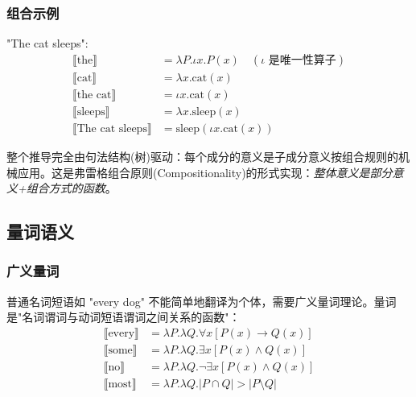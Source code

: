 \subsubsection{组合示例}

"The cat sleeps":
\begin{equation}
    \begin{aligned}
    \llbracket \text{the} \rrbracket &= \lambda P.\iota x.P(x) \quad (\iota \text{ 是唯一性算子}) \\
    \llbracket \text{cat} \rrbracket &= \lambda x.\text{cat}(x) \\
    \llbracket \text{the cat} \rrbracket &= \iota x.\text{cat}(x) \\
    \llbracket \text{sleeps} \rrbracket &= \lambda x.\text{sleep}(x) \\
    \llbracket \text{The cat sleeps} \rrbracket &= \text{sleep}(\iota x.\text{cat}(x))
    \end{aligned}
\end{equation}

整个推导完全由句法结构(树)驱动：每个成分的意义是子成分意义按组合规则的机械应用。这是弗雷格组合原则(Compositionality)的形式实现：\emph{整体意义是部分意义+组合方式的函数}。

\subsection{量词语义}

\subsubsection{广义量词}

普通名词短语如 "every dog" 不能简单地翻译为个体，需要广义量词理论。量词是"名词谓词与动词短语谓词之间关系的函数"：
\begin{equation}
    \begin{aligned}
    \llbracket \text{every} \rrbracket &= \lambda P.\lambda Q.\forall x[P(x) \rightarrow Q(x)] \\
    \llbracket \text{some} \rrbracket &= \lambda P.\lambda Q.\exists x[P(x) \land Q(x)] \\
    \llbracket \text{no} \rrbracket &= \lambda P.\lambda Q.\neg\exists x[P(x) \land Q(x)] \\
    \llbracket \text{most} \rrbracket &= \lambda P.\lambda Q.|P \cap Q| > |P \setminus Q|
    \end{aligned}
\end{equation}

